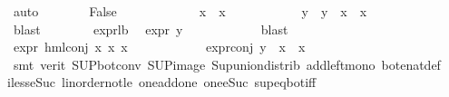 \begin{isabellebody}
\ auto\isanewline
\ \ \ \ \isamarkupfalse%
\ \isamarkupfalse%
\ False\isanewline
\ \ \ \ \isamarkupfalse%
\isanewline
\ \ \ \ \ \ \isamarkupfalse%
\ {\isachardoublequoteopen}x{}{}\ {\isacharbackquote}{\kern0pt}\ x{}{}\ {\isasymnoteq}\ {\isacharbraceleft}{\kern0pt}{\isacharbraceright}{\kern0pt}{\isachardoublequoteclose}\isanewline
\ \ \ \ \ \ \isamarkupfalse%
\ \isamarkupfalse%
\ y\ \ {\isachardoublequoteopen}y\ {\isasymin}\ {\isacharparenleft}{\kern0pt}x{}{}\ {\isacharbackquote}{\kern0pt}\ x{}{}{\isacharparenright}{\kern0pt}{\isachardoublequoteclose}\ \isanewline
\ \ \ \ \ \ \ \ \isamarkupfalse%
\ blast\isanewline
\ \ \ \ \ \ \isamarkupfalse%
\ expr{\isacharunderscore}{\kern0pt}{}{\isacharunderscore}{\kern0pt}lb\ \isamarkupfalse%
\ {\isachardoublequoteopen}expr{\isacharunderscore}{\kern0pt}{}\ y\ {\isasymge}\ {}{\isachardoublequoteclose}\isanewline
\ \ \ \ \ \ \ \ \isamarkupfalse%
\ blast\isanewline
\ \ \ \ \ \ \isamarkupfalse%
\ {\isachardoublequoteopen}expr{\isacharunderscore}{\kern0pt}{}\ {\isacharparenleft}{\kern0pt}hml{\isacharunderscore}{\kern0pt}conj\ x{}{}\ x{}{}\ x{}{}{\isacharparenright}{\kern0pt}\ {\isasymge}\ {}{\isachardoublequoteclose}\isanewline
\ \ \ \ \ \ \ \ \isamarkupfalse%
\ expr{\isacharunderscore}{\kern0pt}{}{\isacharunderscore}{\kern0pt}conj\ {\isacartoucheopen}y\ {\isasymin}\ {\isacharparenleft}{\kern0pt}x{}{}\ {\isacharbackquote}{\kern0pt}\ x{}{}{\isacharparenright}{\kern0pt}{\isacartoucheclose}\ \isanewline
\ \ \ \ \ \ \ \ \isamarkupfalse%
\ {\isacharparenleft}{\kern0pt}smt\ {\isacharparenleft}{\kern0pt}verit{\isacharparenright}{\kern0pt}\ SUP{\isacharunderscore}{\kern0pt}bot{\isacharunderscore}{\kern0pt}conv{\isacharparenleft}{\kern0pt}{}{\isacharparenright}{\kern0pt}\ SUP{\isacharunderscore}{\kern0pt}image\ Sup{\isacharunderscore}{\kern0pt}union{\isacharunderscore}{\kern0pt}distrib\ add{\isacharunderscore}{\kern0pt}left{\isacharunderscore}{\kern0pt}mono\ bot{\isacharunderscore}{\kern0pt}enat{\isacharunderscore}{\kern0pt}def\ \isanewline
iless{\isacharunderscore}{\kern0pt}eSuc{}\ linorder{\isacharunderscore}{\kern0pt}not{\isacharunderscore}{\kern0pt}le\ one{\isacharunderscore}{\kern0pt}add{\isacharunderscore}{\kern0pt}one\ one{\isacharunderscore}{\kern0pt}eSuc\ sup{\isacharunderscore}{\kern0pt}eq{\isacharunderscore}{\kern0pt}bot{\isacharunderscore}{\kern0pt}iff{\isacharparenright}{\kern0pt}\isanewline

\end{isabellebody}
